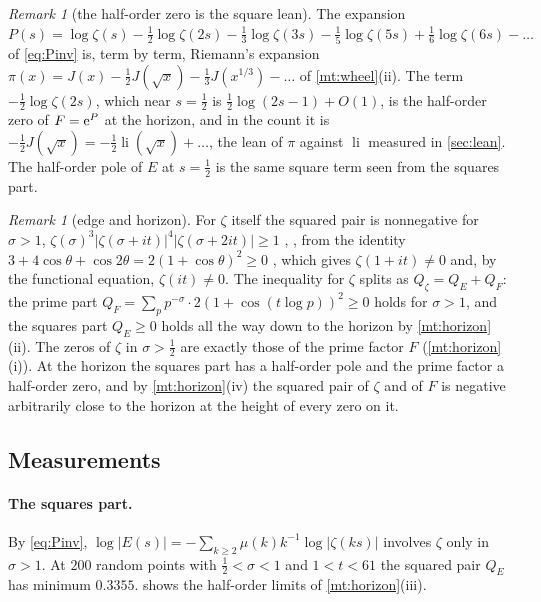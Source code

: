 \documentclass[11pt]{article}
\theoremstyle{definition}\newtheorem{definition}[theorem]{Definition}
\theoremstyle{remark}\newtheorem{remark}[theorem]{Remark}
\theoremstyle{definition}\newtheorem{axiom}{Axiom}
\newcommand{\li}{\operatorname{li}}\newcommand{\Tr}{\operatorname{Tr}}
\begin{document}
\begin{remark}[the half-order zero is the square lean]\label{rem:halforder}
The expansion $P(s)=\log\zeta(s)-\frac12\log\zeta(2s)-\frac13\log\zeta(3s)-\frac15\log\zeta(5s)+\frac16\log\zeta(6s)-\dots$ of \eqref{eq:Pinv} is, term by term, Riemann's expansion $\pi(x)=J(x)-\frac12J(\sqrt x)-\frac13J(x^{1/3})-\dots$ of \cref{mt:wheel}(ii). The term $-\frac12\log\zeta(2s)$, which near $s=\frac12$ is $\frac12\log(2s-1)+O(1)$, is the half-order zero of $F=\mathrm e^P$ at the horizon, and in the count it is $-\frac12J(\sqrt x)=-\frac12\li(\sqrt x)+\dots$, the lean of $\pi$ against $\li$ measured in \cref{sec:lean}. The half-order pole of $E$ at $s=\frac12$ is the same square term seen from the squares part.
\end{remark}

\begin{remark}[edge and horizon]\label{rem:edge}
For $\zeta$ itself the squared pair is nonnegative for $\sigma>1$, $\zeta(\sigma)^3|\zeta(\sigma+it)|^4|\zeta(\sigma+2it)|\ge1$ \cite{Mertens}, \cite[\S3.3]{Titchmarsh}, from the identity $3+4\cos\theta+\cos2\theta=2(1+\cos\theta)^2\ge0$ \cite[(3.3.1)]{Titchmarsh}, which gives $\zeta(1+it)\ne0$ and, by the functional equation, $\zeta(it)\ne0$. The inequality for $\zeta$ splits as $Q_\zeta=Q_E+Q_F$: the prime part $Q_F=\sum_pp^{-\sigma}\cdot2(1+\cos(t\log p))^2\ge0$ holds for $\sigma>1$, and the squares part $Q_E\ge0$ holds all the way down to the horizon by \cref{mt:horizon}(ii). The zeros of $\zeta$ in $\sigma>\frac12$ are exactly those of the prime factor $F$ (\cref{mt:horizon}(i)). At the horizon the squares part has a half-order pole and the prime factor a half-order zero, and by \cref{mt:horizon}(iv) the squared pair of $\zeta$ and of $F$ is negative arbitrarily close to the horizon at the height of every zero on it.
\end{remark}

\subsection{Measurements}

\paragraph{The squares part.} By \eqref{eq:Pinv}, $\log|E(s)|=-\sum_{k\ge2}\mu(k)k^{-1}\log|\zeta(ks)|$ involves $\zeta$ only in $\sigma>1$. At $200$ random points with $\frac12<\sigma<1$ and $1<t<61$ the squared pair $Q_E$ has minimum $0.3355$.  shows the half-order limits of \cref{mt:horizon}(iii).
\end{document}
